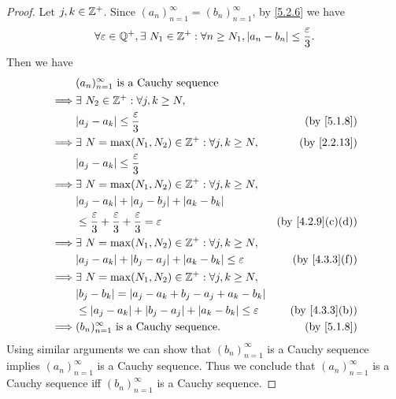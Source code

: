 \begin{proof}
  Let \(j, k \in \mathbb{Z}^+\).
  Since \((a_n)_{n = 1}^\infty = (b_n)_{n = 1}^\infty\), by \cref{5.2.6} we have
  \[
    \forall \varepsilon \in \mathbb{Q}^+, \exists\ N_1 \in \mathbb{Z}^+ : \forall n \geq N_1, \left\lvert a_n - b_n\right\rvert \leq \frac{\varepsilon}{3}.
  \]
  Then we have
  \begin{align*}
             & (a_n)_{n = 1}^\infty \text{ is a Cauchy sequence}                                                                         \\
    \implies & \exists\ N_2 \in \Z^+ : \forall j, k \geq N,                                                                              \\
             & \abs{a_j - a_k} \leq \frac{\varepsilon}{3}                                               & \text{(by \cref{5.1.8})}       \\
    \implies & \exists\ N = \max(N_1, N_2) \in \Z^+ : \forall j, k \geq N,                              & \text{(by \cref{2.2.13})}      \\
             & \abs{a_j - a_k} \leq \frac{\varepsilon}{3}                                                                                \\
    \implies & \exists\ N = \max(N_1, N_2) \in \Z^+ : \forall j, k \geq N,                                                               \\
             & \abs{a_j - a_k} + \abs{a_j - b_j} + \abs{a_k - b_k}                                                                       \\
             & \leq \frac{\varepsilon}{3} + \frac{\varepsilon}{3} + \frac{\varepsilon}{3} = \varepsilon & \text{(by \cref{4.2.9}(c)(d))} \\
    \implies & \exists\ N = \max(N_1, N_2) \in \Z^+ : \forall j, k \geq N,                                                               \\
             & \abs{a_j - a_k} + \abs{b_j - a_j} + \abs{a_k - b_k} \leq \varepsilon                     & \text{(by \cref{4.3.3}(f))}    \\
    \implies & \exists\ N = \max(N_1, N_2) \in \Z^+ : \forall j, k \geq N,                                                               \\
             & \abs{b_j - b_k} = \abs{a_j - a_k + b_j - a_j + a_k - b_k}                                                                 \\
             & \leq \abs{a_j - a_k} + \abs{b_j - a_j} + \abs{a_k - b_k} \leq \varepsilon                & \text{(by \cref{4.3.3}(b))}    \\
    \implies & (b_n)_{n = 1}^\infty \text{ is a Cauchy sequence}.                                       & \text{(by \cref{5.1.8})}
  \end{align*}
  Using similar arguments we can show that \((b_n)_{n = 1}^\infty\) is a Cauchy sequence implies \((a_n)_{n = 1}^\infty\) is a Cauchy sequence.
  Thus we conclude that \((a_n)_{n = 1}^\infty\) is a Cauchy sequence iff \((b_n)_{n = 1}^\infty\) is a Cauchy sequence.
\end{proof}

